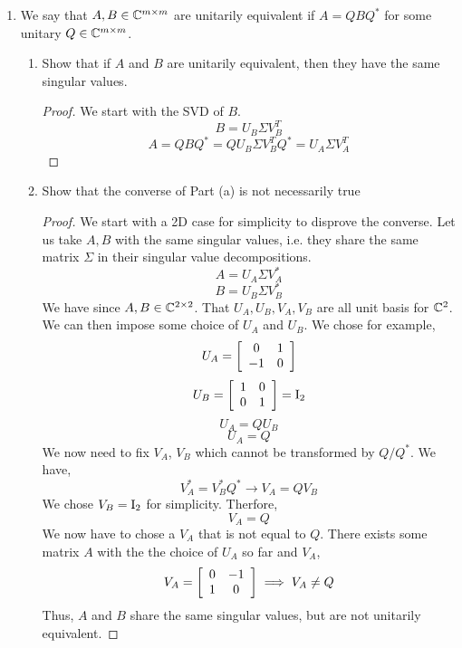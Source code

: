 \documentclass{article}
\begin{document}
\begin{enumerate}
    \item %
    We say that $A, B \in \mathbb{C}^{m\times m}$ are unitarily equivalent if $A = QBQ^*$ for some
unitary $Q \in \mathbb{C}^{m\times m}$.
    \begin{enumerate}
    \item 
    Show that if $A$ and $B$ are unitarily equivalent, then they have the
same singular values.
    \begin{proof}
        We start with the SVD of $B$. 
        \[
            B = U_B\Sigma V_B^T 
        \]
        \[
            A = QBQ^* = QU_B\Sigma V_B^TQ^* = U_A\Sigma V_A^T
        \]
    \end{proof}
    \item 
    Show that the converse of Part (a) is not necessarily true
    \begin{proof}
        We start with a 2D case for simplicity to disprove the converse. Let us take $A, B$ with the same singular values, i.e. they share the same matrix $\Sigma$ in their singular value decompositions.
        \[
            A = U_A\Sigma V_A^*
        \]
        \[
            B = U_B\Sigma V_B^*
        \]
        We have since $A, B \in \mathbb{C}^{2\times 2}$. That $U_A, U_B, V_A, V_B$ are all unit basis for $\mathbb{C}^2$. We can then impose some choice of $U_A$ and $U_B$. We chose for example, 
        \[
            U_A = \left[\begin{array}{c c}
                        0 & 1 \\
                        -1 & 0 \end{array}\right]
        \]
        \[
            U_B = \left[\begin{array}{c c}
                        1 & 0 \\
                        0 & 1 \end{array}\right] = \mathrm{I}_2
        \]
        \[
            U_A = QU_B 
        \]
        \[
            U_A = Q
        \]
        We now need to fix $V_A$, $V_B$ which cannot be transformed by $Q/Q^*$. We have, 
        \[
            V_A^* = V_B^*Q^* \to V_A = QV_B
        \]
        We chose $V_B = \mathrm{I}_2$ for simplicity. Therfore,
        \[
            V_A = Q
        \]
        We now have to chose a $V_A$ that is not equal to $Q$. There exists some matrix $A$ with the the choice of $U_A$ so far and $V_A$, 
        \[
            V_A = \left[\begin{array}{c c}
                        0 & -1 \\
                        1 & 0 \end{array}\right] \implies V_A \neq Q
        \]
        Thus, $A$ and $B$ share the same singular values, but are not unitarily equivalent. 
    \end{proof}
    \end{enumerate}%


\end{enumerate}
\end{document}
